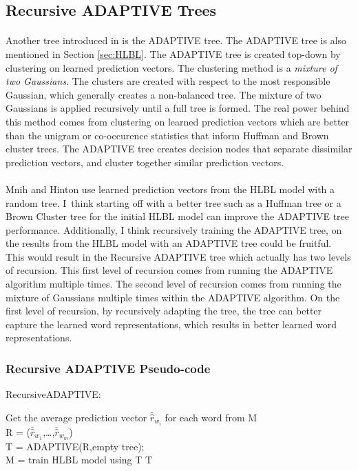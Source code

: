 \subsection{Recursive ADAPTIVE Trees} \label{sec:recursiveADAPTIVETree}
\paragraph{}
Another tree introduced in \cite{MnihHinton2009} is the ADAPTIVE tree. The ADAPTIVE tree is also mentioned in Section \ref{sec:HLBL}. The ADAPTIVE tree is created top-down by clustering on learned prediction vectors. The clustering method is a \emph{mixture of two Gaussians}. The clusters are created with respect to the most responsible Gaussian, which generally creates a non-balanced tree. The mixture of two Gaussians is applied recursively until a full tree is formed. The real power behind this method comes from clustering on learned prediction vectors which are better than the unigram or co-occurence statistics that inform Huffman and Brown cluster trees. The ADAPTIVE tree creates decision nodes that separate dissimilar prediction vectors, and cluster together similar prediction vectors. 

\paragraph{}
Mnih and Hinton use learned prediction vectors from the HLBL model with a random tree. I~think starting off with a better tree such as a Huffman tree or a Brown Cluster tree for the initial HLBL model can improve the ADAPTIVE tree performance. Additionally, I think recursively training the ADAPTIVE tree, on the results from the HLBL model with an ADAPTIVE tree could be fruitful. This would result in the Recursive ADAPTIVE tree which actually has two levels of recursion. This first level of recursion comes from running the ADAPTIVE algorithm multiple times. The second level of recursion comes from running the mixture of Gaussians multiple times within the ADAPTIVE algorithm.  On the first level of recursion, by recursively adapting the tree, the tree can better capture the learned word representations, which results in better learned word representations. 
\subsubsection{Recursive ADAPTIVE Pseudo-code}

\begin{algorithm}
\SetAlgoLined
RecursiveADAPTIVE: \\

 {
 	Get the average prediction vector $\bar{\hat{r}}_{w_i}$ for each word from M
 	\\R = ($\bar{\hat{r}}_{w_1}$,\dots,$\bar{\hat{r}}_{w_m}$)
	\\T = ADAPTIVE(R,empty tree);
	\\M = train HLBL model using T
}
\Return T
\end{algorithm}

